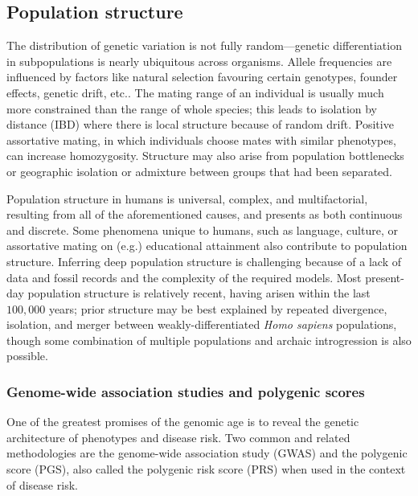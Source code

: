 \subsection{Population structure}

The distribution of genetic variation is not fully random---genetic differentiation in subpopulations is nearly ubiquitous across organisms. Allele frequencies are influenced by factors like natural selection favouring certain genotypes, founder effects, genetic drift, etc.\citep{hartl2007principles_6}. The mating range of an individual is usually much more constrained than the range of whole species; this leads to isolation by distance (IBD) where there is local structure because of random drift\citep{wright_isolation_1943}. Positive assortative mating, in which individuals choose mates with similar phenotypes, can increase homozygosity\citep{hartl2007principles_6}. Structure may also arise from population bottlenecks or geographic isolation\citep{crow_kimura_1970_3} or admixture between groups that had been separated\citep{crow_kimura_1970_9}. 

Population structure in humans is universal, complex, and multifactorial, resulting from all of the aforementioned causes, and presents as both continuous and discrete\citep{peter_geometric_2022}. Some phenomena unique to humans, such as language\citep{barbujani_zones_1990}, culture\citep{campbell_evolution_2010}, or assortative mating on (e.g.) educational attainment\citep{robinson_genetic_2017} also contribute to population structure. Inferring deep population structure is challenging because of a lack of data and fossil records and the complexity of the required models. Most present-day population structure is relatively recent, having arisen within the last $100,000$ years; prior structure may be best explained by repeated divergence, isolation, and merger between weakly-differentiated \textit{Homo sapiens} populations, though some combination of multiple populations and archaic introgression is also possible\citep{ragsdale_weakly_2023}.

\subsubsection{Genome-wide association studies and polygenic scores}

One of the greatest promises of the genomic age is to reveal the genetic architecture of phenotypes and disease risk. Two common and related methodologies are the genome-wide association study (GWAS) and the polygenic score (PGS), also called the polygenic risk score (PRS) when used in the context of disease risk.

